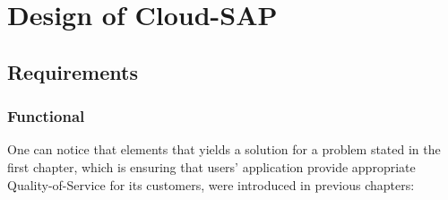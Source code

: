 \chapter{Design of Cloud-SAP}


\section{Requirements}

\subsection{Functional}
One can notice that elements that yields a solution for
a problem stated in the first chapter, which is ensuring that users'
application provide appropriate Quality-of-Service for its customers, were
introduced in previous chapters:

